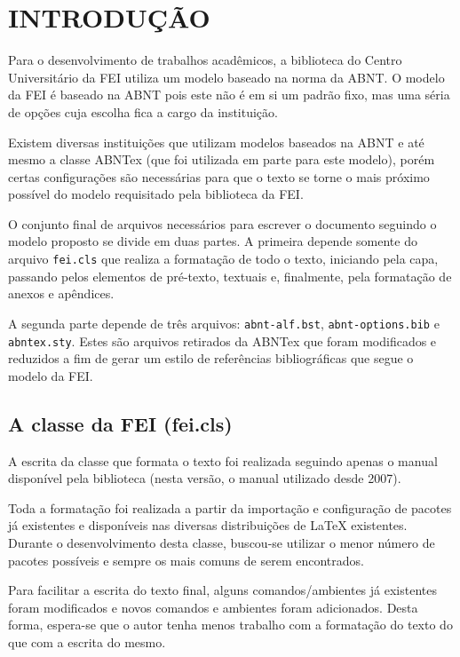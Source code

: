 \chapter{INTRODUÇÃO}

Para o desenvolvimento de trabalhos acadêmicos, a biblioteca do Centro Universitário da FEI utiliza um modelo baseado na norma da ABNT. O modelo da FEI é baseado na ABNT pois este não é em si um padrão fixo, mas uma séria de opções cuja escolha fica a cargo da instituição.

Existem diversas instituições que utilizam modelos baseados na ABNT e até mesmo a classe ABNTex (que foi utilizada em parte para este modelo), porém certas configurações são necessárias para que o texto se torne o mais próximo possível do modelo requisitado pela biblioteca da FEI.

O conjunto final de arquivos necessários para escrever o documento seguindo o modelo proposto se divide em duas partes. A primeira depende somente do arquivo \texttt{fei.cls} que realiza a formatação de todo o texto, iniciando pela capa, passando pelos elementos de pré-texto, textuais e, finalmente, pela formatação de anexos e apêndices. 

A segunda parte depende de três arquivos: \texttt{abnt-alf.bst}, \texttt{abnt-options.bib} e \texttt{abntex.sty}. Estes são arquivos retirados da ABNTex que foram modificados e reduzidos a fim de gerar um estilo de referências bibliográficas que segue o modelo da FEI.

\section{A classe da FEI (fei.cls)}

A escrita da classe que formata o texto foi realizada seguindo apenas o manual disponível pela biblioteca (nesta versão, o manual utilizado desde 2007).

Toda a formatação foi realizada a partir da importação e configuração de pacotes já existentes e disponíveis nas diversas distribuições de \LaTeX{} existentes. Durante o desenvolvimento desta classe, buscou-se utilizar o menor número de pacotes possíveis e sempre os mais comuns de serem encontrados.

Para facilitar a escrita do texto final, alguns comandos/ambientes já existentes foram modificados e novos comandos e ambientes foram adicionados. Desta forma, espera-se que o autor tenha menos trabalho com a formatação do texto do que com a escrita do mesmo.

